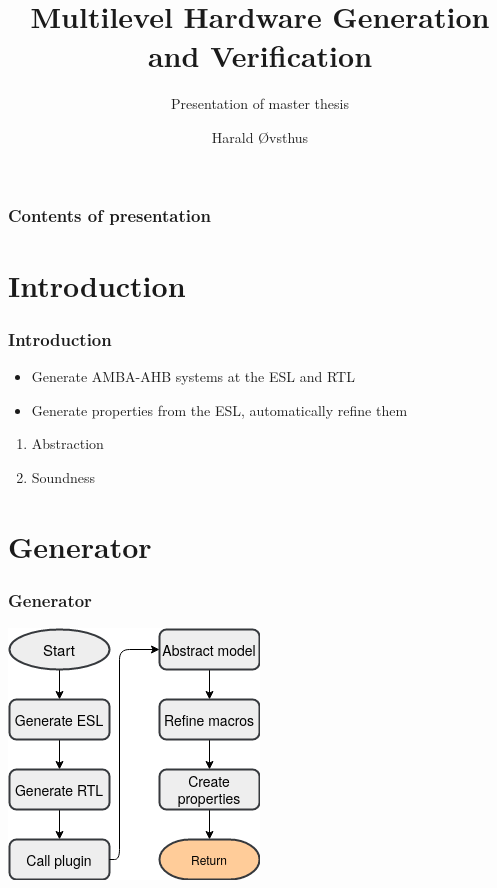 \documentclass[]{beamer}
\title{Multilevel Hardware Generation and Verification}
\subtitle{Presentation of master thesis}
\author{Harald Øvsthus}
\begin{document}
	\begin{frame}[plain]
\addtocounter{framenumber}{-1}
		\titlepage
	\end{frame}

	\begin{frame}
\addtocounter{framenumber}{-1}
		\frametitle{Contents of presentation}
		\tableofcontents
	\end{frame}

	\section{Introduction}
	\begin{frame}
		\frametitle{Introduction}
	          \onslide<1->{\textbf{Idea:}}
                  \begin{itemize}
	           \item<1->Generate AMBA-AHB systems at the ESL and RTL
                   \item<1->Generate properties from the ESL, automatically refine them
                  \end{itemize}
                    \begin{enumerate}
                      \item<2-> Abstraction
                      \item<2-> Soundness
                    \end{enumerate}     
	\end{frame}

\section{Generator}
 \begin{frame}
  \frametitle{Generator}
   \begin{center}
   \includegraphics[scale=0.5]{pics/Gen_flow.png}
   \end{center}
 \end{frame}
\end{document}
